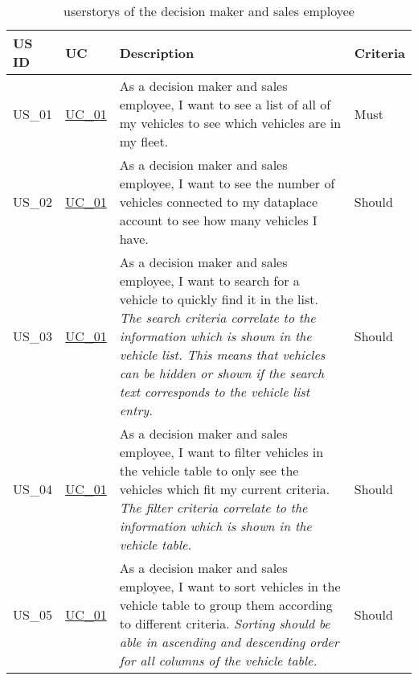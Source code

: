  \sffamily
  \begin{footnotesize}
    \begin{longtable}[L L L L]{ p{} p{} p{} p{}}
      \caption                       %
          {\Glspl{userstory} of the decision maker and sales employee} %
          \\
      \toprule
      \textbf{US ID} & \textbf{UC} & \textbf{Description} & \textbf{Criteria} \\
      \midrule

      \hypertarget{Ref:US1}{US\_01} & \hyperlink{Ref:UC1}{UC\_01} & As a decision maker and sales employee, I want to see a list of all of my vehicles to see which vehicles are in my fleet. & Must \\ 

      \hypertarget{Ref:US2}{US\_02} & \hyperlink{Ref:UC1}{UC\_01} & As a decision maker and sales employee, I want to see the number of vehicles connected to my \gls{dataplace} account to see how many vehicles I have. & Should \\

      \hypertarget{Ref:US3}{US\_03} & \hyperlink{Ref:UC1}{UC\_01} & As a decision maker and sales employee, I want to search for a vehicle to quickly find it in the list.
      \newline
      \emph{The search criteria correlate to the information which is shown in the vehicle list. This means that vehicles can be hidden or shown if the search text corresponds to the vehicle list entry.} & Should
      \\

      \hypertarget{Ref:US4}{US\_04} & \hyperlink{Ref:UC1}{UC\_01} & As a decision maker and sales employee, I want to filter vehicles in the vehicle table to only see the vehicles which fit my current criteria.
      \newline
      \emph{The filter criteria correlate to the information which is shown in the vehicle table.} & Should
      \\

      \hypertarget{Ref:US5}{US\_05} & \hyperlink{Ref:UC1}{UC\_01} & As a decision maker and sales employee, I want to sort vehicles in the vehicle table to group them according to different criteria. 
      \newline
      \emph{Sorting should be able in ascending and descending order for all columns of the vehicle table.} & Should
      \\


\end{longtable}
\end{footnotesize}
